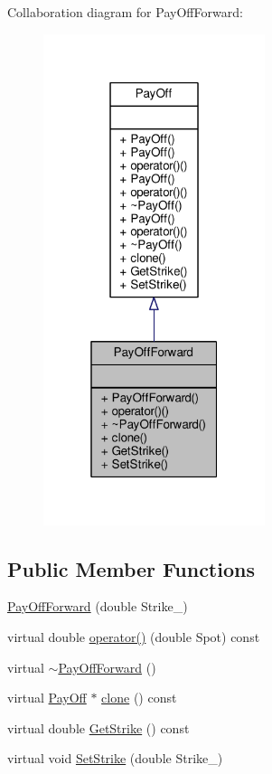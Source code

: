Collaboration diagram for Pay\+Off\+Forward\+:
\nopagebreak
\begin{figure}[H]
\begin{center}
\leavevmode
\includegraphics[width=184pt]{classPayOffForward__coll__graph}
\end{center}
\end{figure}
\subsection*{Public Member Functions}
\begin{DoxyCompactItemize}
\item 
\hyperlink{classPayOffForward_adde9bc6ed466bd16d89d92182fd63847}{Pay\+Off\+Forward} (double Strike\+\_\+)
\item 
virtual double \hyperlink{classPayOffForward_a4b2921e71a9cb7eba5175c8f331061f8}{operator()} (double Spot) const
\item 
virtual \hyperlink{classPayOffForward_a638b856552b79d138c2b685fbebf086e}{$\sim$\+Pay\+Off\+Forward} ()
\item 
virtual \hyperlink{classPayOff}{Pay\+Off} $\ast$ \hyperlink{classPayOffForward_aca37e8270f086f8e55ff9fd1038d64b4}{clone} () const
\item 
virtual double \hyperlink{classPayOffForward_aa485cf251b7121a71396d3f107b35ff9}{Get\+Strike} () const
\item 
virtual void \hyperlink{classPayOffForward_a3c0f3d6400d4d8fb0339edfca3d5b2bb}{Set\+Strike} (double Strike\+\_\+)
\end{DoxyCompactItemize}
